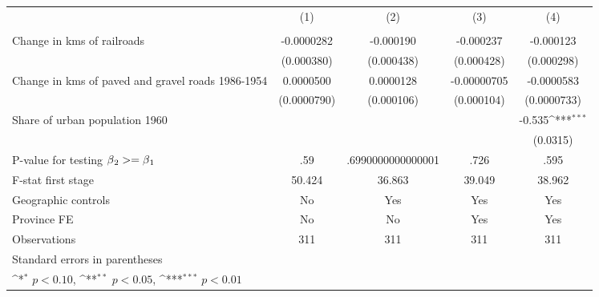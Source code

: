 {
\def\sym#1{\ifmmode^{#1}\else\(^{#1}\)\fi}
\begin{tabular}{l*{4}{c}}
\hline\hline
                &\multicolumn{1}{c}{(1)}&\multicolumn{1}{c}{(2)}&\multicolumn{1}{c}{(3)}&\multicolumn{1}{c}{(4)}\\
                &\multicolumn{1}{c}{}&\multicolumn{1}{c}{}&\multicolumn{1}{c}{}&\multicolumn{1}{c}{}\\
\hline
Change in kms of railroads&-0.0000282         &-0.000190         &-0.000237         &-0.000123         \\
                &(0.000380)         &(0.000438)         &(0.000428)         &(0.000298)         \\
[1em]
Change in kms of paved and gravel roads 1986-1954&0.0000500         &0.0000128         &-0.00000705         &-0.0000583         \\
                &(0.0000790)         &(0.000106)         &(0.000104)         &(0.0000733)         \\
[1em]
Share of urban population 1960&                  &                  &                  &   -0.535\sym{***}\\
                &                  &                  &                  & (0.0315)         \\
\hline
P-value for testing $\beta\\_2 >= \beta\\_1$&      .59         &.6990000000000001         &     .726         &     .595         \\
F-stat first stage&   50.424         &   36.863         &   39.049         &   38.962         \\
Geographic controls&       No         &      Yes         &      Yes         &      Yes         \\
Province FE     &       No         &       No         &      Yes         &      Yes         \\
Observations    &      311         &      311         &      311         &      311         \\
\hline\hline
\multicolumn{5}{l}{\footnotesize Standard errors in parentheses}\\
\multicolumn{5}{l}{\footnotesize \sym{*} \(p<0.10\), \sym{**} \(p<0.05\), \sym{***} \(p<0.01\)}\\
\end{tabular}
}

